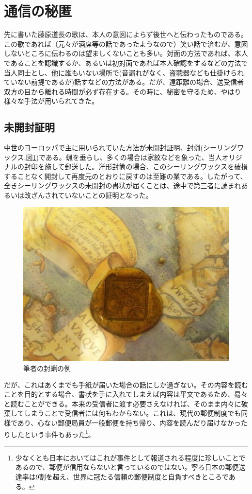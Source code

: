 \section{通信の秘匿}

先に書いた藤原道長の歌は、本人の意図によらず後世へと伝わったものである。この歌であれば（元々が酒席等の話であったようなので）笑い話で済むが、意図しないところに伝わるのは望ましくないことも多い。対面の方法であれば、本人であることを認識するか、あるいは初対面であれば本人確認をするなどの方法で当人同士とし、他に誰もいない場所で(音漏れがなく、盗聴器なども仕掛けられていない前提であるが)話すなどの方法がある。だが、遠距離の場合、送受信者双方の目から離れる時間が必ず存在する。その時に、秘密を守るため、やはり様々な手法が用いられてきた。

\subsection{未開封証明}

中世のヨーロッパで主に用いられていた方法が未開封証明、封蝋(シーリングワックス,図\ref{fig0_3})である。蝋を垂らし、多くの場合は家紋などを象った、当人オリジナルの封印を施して郵送した。洋形封筒の場合、このシーリングワックスを破損することなく開封して再度元のとおりに戻すのは至難の業である。したがって、全きシーリングワックスの未開封の書状が届くことは、途中で第三者に読まれあるいは改ざんされていないことの証明となった。

\begin{figure}[htbp]
\centering
\includegraphics[width=0.5\linewidth,keepaspectratio,bb=0 0 539 404]{fig/fig0_3.jpg}
\caption{筆者の封蝋の例}\label{fig0_3}
\end{figure}

だが、これはあくまでも手紙が届いた場合の話にしか過ぎない。その内容を読むことを目的とする場合、書状を手に入れてしまえば内容は平文であるため、易々と読むことができる。本来の受信者に渡す必要さえなければ、そのまま内々に破棄してしまうことで受信者には何もわからない。これは、現代の郵便制度でも同様であり、心ない郵便局員が一般郵便を持ち帰り、内容を読んだり届けなかったりしたという事件もあった\footnote{少なくとも日本においてはこれが事件として報道される程度に珍しいことであるので、郵便が信用ならないと言っているのではない。寧ろ日本の郵便送達率は9割を超え、世界に冠たる信頼の郵便制度と自負すべきところである。}。

